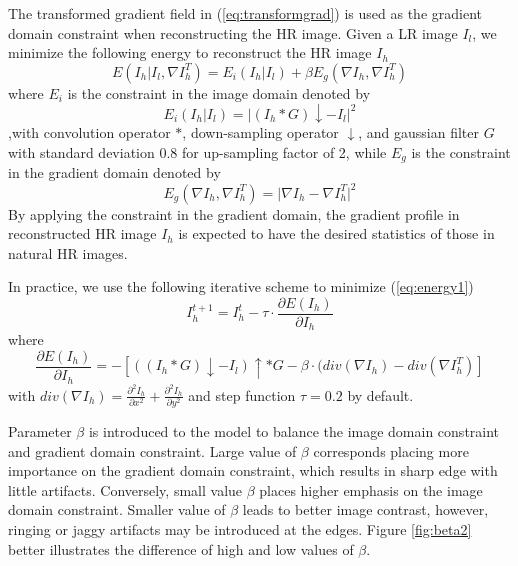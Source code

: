 \documentclass[a4paper,11pt]{article}
\begin{document}
The transformed gradient field in (\ref{eq:transformgrad}) is used as the gradient domain constraint when reconstructing the HR image. Given a LR image $I_l$, we minimize the following energy to reconstruct the HR image $I_h$
\begin{equation}
	\label{eq:energy1}
	E(I_h | I_l, \nabla I_h^T) = E_i(I_h | I_l) + \beta E_g(\nabla I_h, \nabla I_h^T) 
\end{equation}
where $E_i$ is the constraint in the image domain denoted by
\begin{equation}
	\label{eq:energyi}
	E_i(I_h | I_l) = \lvert (I_h \ast G) \downarrow - I_l \rvert^2
\end{equation}
,with convolution operator $\ast$, down-sampling operator $\downarrow$, and gaussian filter $G$ with standard deviation 0.8 for up-sampling factor of 2, while $E_g$ is the constraint in the gradient domain denoted by
\begin{equation}
	\label{eq:energyg}
	E_g(\nabla I_h, \nabla I_h^T) = \lvert \nabla I_h - \nabla I_h^T \rvert^2
\end{equation}
By applying the constraint in the gradient domain, the gradient profile in reconstructed HR image $I_h$ is expected to have the desired statistics of those in natural HR images.

In practice, we use the following iterative scheme to minimize (\ref{eq:energy1})
\begin{equation}
	I_h^{t+1} = I_h^t - \tau \cdot \frac{\partial E(I_h)}{\partial I_h}
\end{equation}
where
\begin{equation}
	\frac{\partial E(I_h)}{\partial I_h} = - [((I_h \ast G) \downarrow - I_l) \uparrow \ast G - \beta \cdot (div(\nabla I_h) - div(\nabla I_h^T)]
\end{equation}
 with $div(\nabla I_h) = \frac{\partial^2 I_h}{\partial x^2} + \frac{\partial^2 I_h}{\partial y^2}$ and step function $\tau =0.2$ by default.

Parameter $\beta$ is introduced to the model to balance the image domain constraint and gradient domain constraint. Large value of $\beta$ corresponds placing more importance on the gradient domain constraint, which results in sharp edge with little artifacts. Conversely, small value $\beta$ places higher emphasis on the image domain constraint. Smaller value of $\beta$ leads to better image contrast, however, ringing or jaggy artifacts may be introduced at the edges. Figure \ref{fig:beta2} better illustrates the difference of high and low values of $\beta$.
\end{document}
